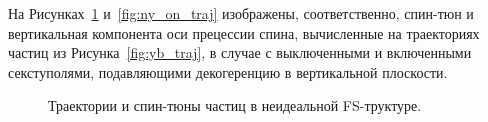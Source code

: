 На Рисунках~\ref{fig:spin_tune_on_traj} и~\ref{fig:ny_on_traj} изображены, соответственно, спин-тюн и вертикальная компонента оси прецессии спина, вычисленные на траекториях частиц из Рисунка~\ref{fig:yb_traj}, в случае с выключенными и включенными секступолями, подавляющими декогеренцию в вертикальной плоскости. 
\begin{figure}[!h]
	\centering
	\hfill
	\hfill
	\caption{Траектории и спин-тюны частиц в неидеальной FS-труктуре.\label{fig:spin_tune_on_traj}}
\end{figure}

